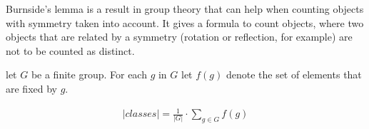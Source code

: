 
Burnside's lemma is a result in group theory that can help when counting objects with symmetry taken into account. It gives a formula to count objects, where two objects that are related by a symmetry (rotation or reflection, for example) are not to be counted as distinct.

let $G$ be a finite group. For each $g$ in $G$ let $f(g)$ denote the set of elements that are fixed by $g$.

\begin{gather*}
  |classes| = \frac{1}{|G|} \cdot \sum_{g \in G} f(g)  
\end{gather*}

\vspace{-5pt}